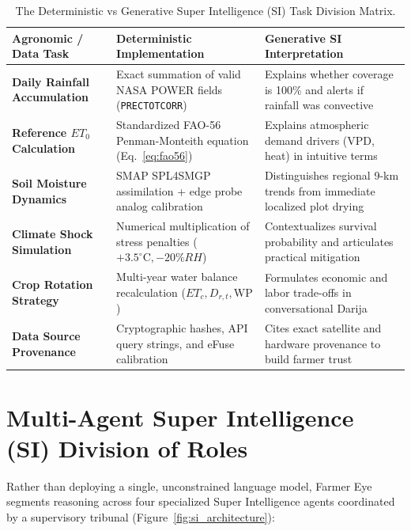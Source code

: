 \documentclass[11pt,a4paper,oneside]{report}
\begin{document}
\begin{table}[h!]
\centering
\small
\begin{tabularx}{\linewidth}{lXX}
\toprule
\textbf{Agronomic / Data Task} & \textbf{Deterministic Implementation} & \textbf{Generative SI Interpretation} \\
\midrule
\textbf{Daily Rainfall Accumulation} & Exact summation of valid NASA POWER fields (\texttt{PRECTOTCORR}) & Explains whether coverage is 100\% and alerts if rainfall was convective \\
\textbf{Reference $ET_0$ Calculation} & Standardized FAO-56 Penman-Monteith equation (Eq.~\ref{eq:fao56}) & Explains atmospheric demand drivers (VPD, heat) in intuitive terms \\
\textbf{Soil Moisture Dynamics} & SMAP SPL4SMGP assimilation + edge probe analog calibration & Distinguishes regional 9-km trends from immediate localized plot drying \\
\textbf{Climate Shock Simulation} & Numerical multiplication of stress penalties ($+3.5^\circ\text{C}, -20\% RH$) & Contextualizes survival probability and articulates practical mitigation \\
\textbf{Crop Rotation Strategy} & Multi-year water balance recalculation ($ET_c, D_{r,t}, \text{WP}$) & Formulates economic and labor trade-offs in conversational Darija \\
\textbf{Data Source Provenance} & Cryptographic hashes, API query strings, and eFuse calibration & Cites exact satellite and hardware provenance to build farmer trust \\
\bottomrule
\end{tabularx}
\caption{The Deterministic vs Generative Super Intelligence (SI) Task Division Matrix.}
\label{tab:deterministic_vs_si}
\end{table}

\section{Multi-Agent Super Intelligence (SI) Division of Roles}
Rather than deploying a single, unconstrained language model, Farmer Eye segments reasoning across four specialized Super Intelligence agents coordinated by a supervisory tribunal (Figure~\ref{fig:si_architecture}):
\end{document}
